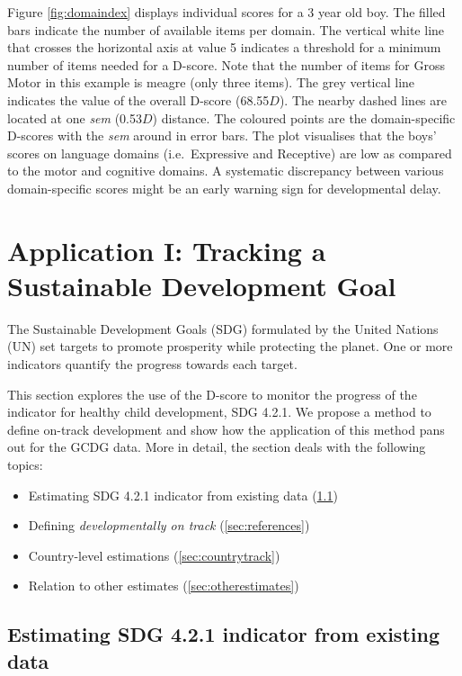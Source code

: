 \documentclass[
]{book}
\providecommand{\tightlist}{%
  \setlength{\itemsep}{0pt}\setlength{\parskip}{0pt}}
\begin{document}
Figure \ref{fig:domaindex} displays individual scores for a 3 year old boy. The filled bars indicate the number of available items per domain. The vertical white line that crosses the horizontal axis at value 5 indicates a threshold for a minimum number of items needed for a D-score. Note that the number of items for Gross Motor in this example is meagre (only three items). The grey vertical line indicates the value of the overall D-score (68.55\(D\)). The nearby dashed lines are located at one \emph{sem} (0.53\(D\)) distance. The coloured points are the domain-specific D-scores with the \emph{sem} around in error bars. The plot visualises that the boys' scores on language domains (i.e.~Expressive and Receptive) are low as compared to the motor and cognitive domains. A systematic discrepancy between various domain-specific scores might be an early warning sign for developmental delay.

\hypertarget{ch:SDGindicator}{%
\chapter{Application I: Tracking a Sustainable Development Goal}\label{ch:SDGindicator}}

The Sustainable Development Goals (SDG) formulated by the United Nations (UN) set targets to promote prosperity while protecting the planet. One or more indicators quantify the progress towards each target.

This section explores the use of the D-score to monitor the progress of the indicator for healthy child development, SDG 4.2.1. We propose a method to define on-track development and show how the application of this method pans out for the GCDG data. More in detail, the section deals with the following topics:

\begin{itemize}
\tightlist
\item
  Estimating SDG 4.2.1 indicator from existing data (\ref{sec:application1})
\item
  Defining \emph{developmentally on track} (\ref{sec:references})
\item
  Country-level estimations (\ref{sec:countrytrack})
\item
  Relation to other estimates (\ref{sec:otherestimates})
\end{itemize}

\hypertarget{sec:application1}{%
\section{Estimating SDG 4.2.1 indicator from existing data}\label{sec:application1}}
\end{document}
